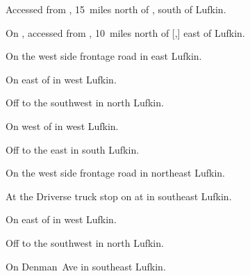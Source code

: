 
\begin{LocationList}

Accessed from , 15~miles north of , south of Lufkin.

On , accessed from , 10~miles north of [,] east of Lufkin.

\Location{\GarageHQ \Garage}
On the west side   frontage road in east Lufkin.

On  east of  in west Lufkin.

Off   to the southwest in north Lufkin.

On  west of  in west Lufkin.

Off  to the east in south Lufkin.

\Location{\TruckService \Service}
On the west side   frontage road in northeast Lufkin.

At the Driverse truck stop on  at  in southeast Lufkin.

On  east of  in west Lufkin.

Off   to the southwest in north Lufkin.

On  Denman~Ave in southeast Lufkin.

\end{LocationList}
